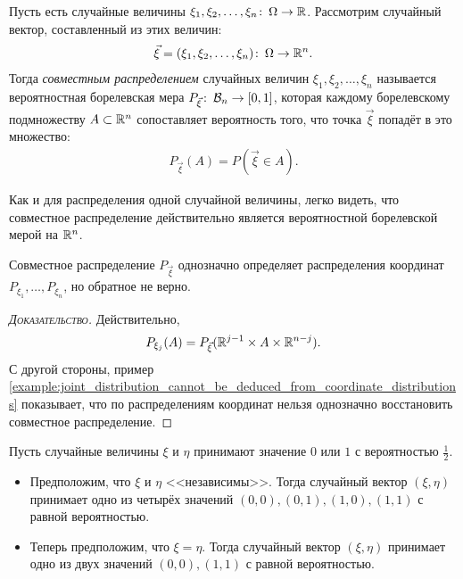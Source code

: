 \documentclass[../main.tex]{subfiles}
\begin{document}
\begin{df}
 Пусть есть случайные величины $ \xi_1, \xi_2, \ldots, \xi_n \colon\,\Omega\to\mathbb{R} $. Рассмотрим случайный вектор, составленный из этих величин:
 \begin{align*}
  \vec\xi = (\xi_1, \xi_2, \ldots,\xi_n)\colon\,\Omega \to \mathbb{R}^{n}.
 \end{align*} Тогда \textit{совместным распределением} случайных величин $ \xi_1, \xi_2, \ldots, \xi_n $ называется вероятностная борелевская мера $ P_{\vec\xi} \colon\,\mathcal B_n \to [0,1] $, которая каждому борелевскому подмножеству $ A \subset \mathbb{R}^{n} $ сопоставляет вероятность того, что точка $ \vec\xi $ попадёт в это множество:
 \begin{align*}
  P_{\vec\xi}(A) = P(\vec\xi \in A).
 \end{align*} 
\end{df}
\begin{remrk}
 Как и для распределения одной случайной величины, легко видеть, что совместное распределение действительно является вероятностной борелевской мерой на $ \mathbb{R}^{n} $.
\end{remrk}
\begin{remrk}
 Совместное распределение $ P_{\vec\xi} $ однозначно определяет распределения координат $ P_{\xi_1}, \ldots, P_{\xi_n} $, но обратное не верно.
\end{remrk} 
\begin{proof}[\normalfont\textsc{Доказательство}]
 Действительно, 
 \begin{align*}
  P_{\xi_j}(A) = P_{\vec\xi}(\mathbb{R}^{j-1} \times A \times \mathbb{R}^{n-j}).
 \end{align*} С другой стороны, пример \ref{example:joint_distribution_cannot_be_deduced_from_coordinate_distributions} показывает, что по распределениям координат нельзя однозначно восстановить совместное распределение.
\end{proof}
\begin{exmpl}
 \label{example:joint_distribution_cannot_be_deduced_from_coordinate_distributions}
 Пусть случайные величины $ \xi $ и $ \eta $ принимают значение $ 0 $ или $ 1 $ с вероятностью $ \frac{1}{2} $.
 \begin{itemize}
  \item Предположим, что $ \xi $ и $ \eta $ <<независимы>>. Тогда случайный вектор $ (\xi, \eta) $ принимает одно из четырёх значений $ (0,0),(0,1),(1,0),(1,1) $ с равной вероятностью.
  \item Теперь предположим, что $ \xi = \eta $. Тогда случайный вектор $ (\xi,\eta) $ принимает одно из двух значений $ (0,0), (1,1) $ с равной вероятностью.
 \end{itemize}
\end{exmpl}
\end{document}

